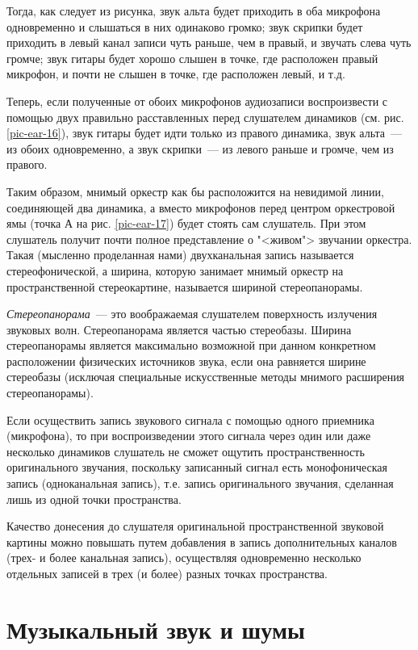 \documentclass[oneside, final, 14pt]{extreport}
\begin{document}
Тогда, как следует из рисунка, звук альта будет приходить в оба микрофона одновременно и слышаться в них одинаково громко; звук скрипки будет приходить в левый канал записи чуть раньше, чем в правый, и звучать слева чуть громче; звук гитары будет хорошо слышен в точке, где расположен правый микрофон, и почти не слышен в точке, где расположен левый, и т.д. 

Теперь, если полученные от обоих микрофонов аудиозаписи воспроизвести с помощью двух правильно расставленных перед слушателем динамиков (см. рис. \ref{pic-ear-16}), звук гитары будет идти только из правого динамика, звук альта~--- из обоих одновременно, а звук скрипки~--- из левого раньше и громче, чем из правого. 

Таким образом, мнимый оркестр как бы расположится на невидимой линии, соединяющей два динамика, а вместо микрофонов перед центром оркестровой ямы (точка А на рис. \ref{pic-ear-17}) будет стоять сам слушатель. При этом слушатель получит почти полное представление о "<живом"> звучании оркестра. Такая (мысленно проделанная нами) двухканальная запись называется стереофонической, а ширина, которую занимает мнимый оркестр на пространственной стереокартине, называется шириной стереопанорамы.

{\itshape Стереопанорама}~--- это воображаемая слушателем поверхность излучения звуковых волн. Стереопанорама является частью стереобазы. Ширина стереопанорамы является максимально возможной при данном конкретном расположении физических источников звука, если она равняется
ширине стереобазы (исключая специальные искусственные методы мнимого расширения стереопанорамы).

Если осуществить запись звукового сигнала с помощью одного приемника (микрофона), то при воспроизведении этого сигнала через один или даже несколько динамиков слушатель не сможет ощутить пространственность оригинального звучания, поскольку записанный сигнал есть монофоническая запись (одноканальная запись), т.е. запись оригинального звучания, сделанная лишь из одной точки пространства.

Качество донесения до слушателя оригинальной пространственной звуковой картины можно повышать путем добавления в запись дополнительных каналов (трех- и более канальная запись), осуществляя одновременно несколько отдельных записей в трех (и более) разных точках пространства.

\section{Музыкальный звук и шумы}
\end{document}

